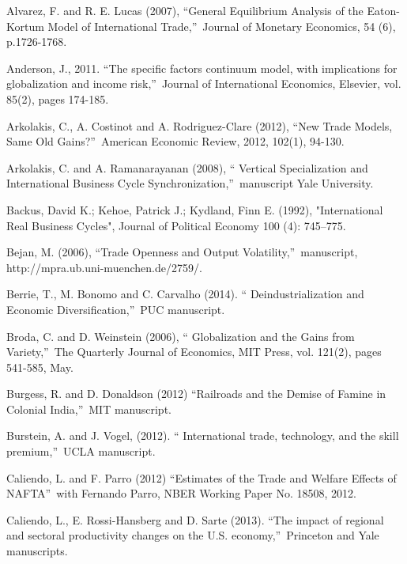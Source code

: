 \documentclass[12pt]{article}
\begin{document}
\begin{thebibliography}{99}
\bibitem{} Alvarez, F. and R. E. Lucas (2007), \textquotedblleft General
Equilibrium Analysis of the Eaton-Kortum Model of International
Trade,\textquotedblright\ Journal of Monetary Economics, 54 (6), p.1726-1768.

\bibitem{} Anderson, J., 2011. \textquotedblleft The specific factors
continuum model, with implications for globalization and income
risk,\textquotedblright\ Journal of International Economics, Elsevier, vol.
85(2), pages 174-185.

\bibitem{} Arkolakis, C., A. Costinot and A. Rodriguez-Clare (2012),
\textquotedblleft New Trade Models, Same Old Gains?\textquotedblright\
American Economic Review, 2012, 102(1), 94-130.

\bibitem{} Arkolakis, C. and A. Ramanarayanan (2008), \textquotedblleft
Vertical Specialization and International Business Cycle
Synchronization,\textquotedblright\ manuscript Yale University.

\bibitem{} Backus, David K.; Kehoe, Patrick J.; Kydland, Finn E. (1992),
"International Real Business Cycles", Journal of Political Economy 100 (4):
745--775.

\bibitem{} Bejan, M. (2006), \textquotedblleft Trade Openness and Output
Volatility,\textquotedblright\ manuscript,
http://mpra.ub.uni-muenchen.de/2759/.

\bibitem{} Berrie, T., M. Bonomo and C. Carvalho (2014). \textquotedblleft
Deindustrialization and Economic Diversification,\textquotedblright\ PUC
manuscript.

\bibitem{} Broda, C. and D. Weinstein (2006), \textquotedblleft
Globalization and the Gains from Variety,\textquotedblright\ The Quarterly
Journal of Economics, MIT Press, vol. 121(2), pages 541-585, May.

\bibitem{} Burgess, R. and D. Donaldson (2012) \textquotedblleft Railroads
and the Demise of Famine in Colonial India,\textquotedblright\ MIT
manuscript.

\bibitem{} Burstein, A. and J. Vogel, (2012). \textquotedblleft
International trade, technology, and the skill premium,\textquotedblright\
UCLA manuscript.

\bibitem{} Caliendo, L. and F. Parro (2012) \textquotedblleft Estimates of
the Trade and Welfare Effects of NAFTA\textquotedblright\ with Fernando
Parro, NBER Working Paper No. 18508, 2012.

\bibitem{} Caliendo, L., E. Rossi-Hansberg and D. Sarte (2013).
\textquotedblleft The impact of regional and sectoral productivity changes
on the U.S. economy,\textquotedblright\ Princeton and Yale manuscripts.


\end{thebibliography}
\end{document}
